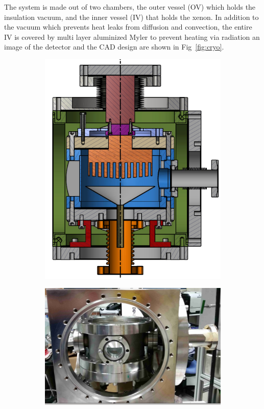 The system is made out of two chambers, the outer vessel (OV) which holds the insulation vacuum, and the inner vessel (IV) that holds the 
xenon. In addition to the vacuum which prevents heat leaks from diffusion and convection, the entire IV is covered by multi layer aluminized 
Myler to prevent heating via radiation an image of the detector and the CAD design are shown in Fig~\ref{fig:cryo}. 
\begin{figure}
	   \centering
	       \begin{subfigure}[c]{0.25\textheight}
		           \includegraphics[width=\textwidth]{cryoMirror.png}
			       \end{subfigure}
			           \begin{subfigure}[c]{0.25\textheight}
					       \includegraphics[width=\textwidth]{cryoOpenCrop.png}

\end{subfigure}
\end{figure}
